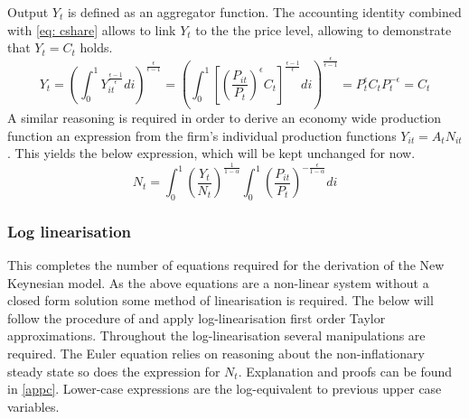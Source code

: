 \documentclass[12pt,a4paper,english]{article} %
\begin{document}
	Output $Y_t$ is defined as an aggregator function. The accounting identity combined with \ref{eq: cshare} allows to link $Y_t$ to the the price level, allowing to demonstrate that $Y_t = C_t$ holds.
	\begin{equation}
			Y_t = 
			\left( 
				\int_{0}^{1} Y_{it}^{\frac{\epsilon - 1}{\epsilon}} di 
			\right)^{\frac{\epsilon}{\epsilon - 1}}
			=
			\left( 
			\int_{0}^{1} 
			\left[
			\left( \frac{P_{it}}{P_t} \right)^\epsilon C_t
			\right]^{\frac{\epsilon - 1}{\epsilon}} di 
			\right)^{\frac{\epsilon}{\epsilon - 1}}
			=
			P_t^{\epsilon} C_t P_t^{-\epsilon}
			=
			C_t
	\end{equation}
	A similar reasoning is required in order to derive an economy wide production function an expression from the firm's individual production functions $Y_{it} = A_t N_{it}$. This yields the below expression, which will be kept unchanged for now.
	\begin{equation} \label{eq: Nt}
		N_t = 	
		\int_{0}^{1} \left( \frac{Y_t}{N_t} \right)^{\frac{1}{1 - \alpha}}
		\int_{0}^{1} \left( \frac{P_{it}}{P_t} \right)^{-\frac{\epsilon}{1 - \alpha}} di
	\end{equation}

	\subsubsection{Log linearisation}
	
	This completes the number of equations required for the derivation of the New Keynesian model. As the above equations are a non-linear system without a closed form solution some method of linearisation is required. The below will follow the procedure of \cite{gali_monetary_2008} and apply log-linearisation first order Taylor approximations. Throughout the log-linearisation several manipulations are required. The Euler equation relies on reasoning about the non-inflationary steady state so does the expression for $N_t$. Explanation and proofs can be found in \ref{appc}. Lower-case expressions are the log-equivalent to previous upper case variables. \\
\end{document}
